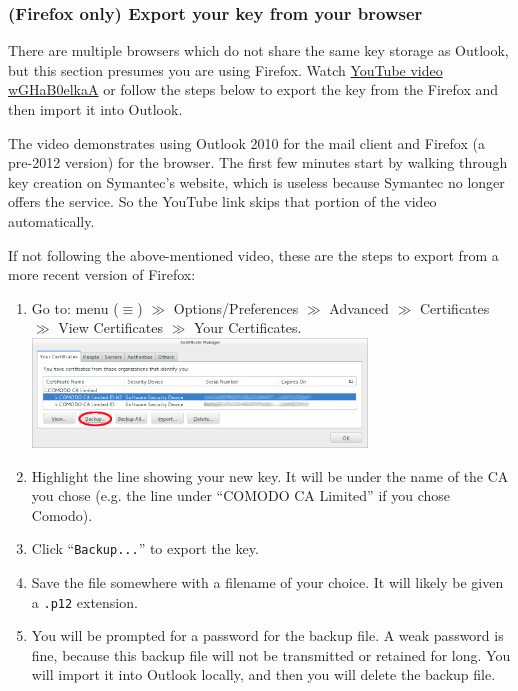 \documentclass[pdftex,12pt,titlepage=false]{scrartcl}
\begin{document}
\subsubsection{(Firefox only) Export your key from your browser}\label{ff_export}
There are multiple browsers which do not share the same key storage as
Outlook, but this section presumes you are using Firefox.  Watch
\href{https://www.youtube.com/watch?v=wGHaB0elkaA\&start=226}{YouTube
  video wGHaB0elkaA} or follow the steps below to export the key from
the Firefox and then import it into Outlook.

The video demonstrates using Outlook 2010 for the mail client and
Firefox (a pre-2012 version) for the browser.  The first few minutes
start by walking through key creation on Symantec's website, which is
useless because Symantec no longer offers the service.  So the YouTube
link skips that portion of the video automatically.

If not following the above-mentioned video, these are the steps to
export from a more recent version of Firefox:

\begin{enumerate}
  \item Go to: menu ($\equiv$) $\gg$ Options/Preferences $\gg$ Advanced
  $\gg$ Certificates $\gg$ View Certificates $\gg$ Your Certificates.\\[1em]%
  \includegraphics[width=0.7\textwidth]{images/firefox_cert_settings.png}
\item Highlight the line showing your new key.  It will be under the
  name of the CA you chose (e.g. the line under ``COMODO CA Limited''
  if you chose Comodo).
\item %
  Click ``\texttt{Backup...}'' to export the key.
\item Save the file somewhere with a filename of your choice.  It will
  likely be given a \verb|.p12| extension.
\item\label{makebupw} You will be prompted for a password for the
  backup file.  A weak password is fine, because this backup file will
  not be transmitted or retained for long.  You will import it into
  Outlook locally, and then you will delete the backup file.
\end{enumerate}
\end{document}
